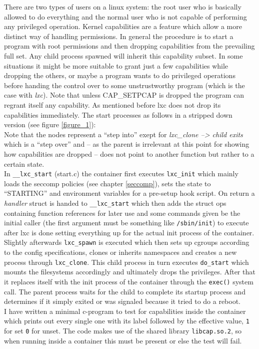 There are two types of users on a linux system: the root user who is basically allowed to do everything and the normal user 
who is not capable of performing any privileged operation. Kernel capabilities are a feature which allow a more distinct way of handling
permissions. In general the procedure is to start a program with root permissions and then dropping capabilities from the prevailing full set.
Any child process spawned will inherit this capability subset.
In some situations it might be more suitable to grant just a few capabilities while dropping the others, or maybe a program wants to do
privileged operations before handing the control over to some unstrustworthy program (which is the case with \textit{lxc}). Note
that unless CAP\_SETPCAP is dropped the program can regrant itself any capability\cite{kernelcaps}.
As mentioned before lxc does not drop its capabilities immediately. The start processes as follows in a stripped down version (see figure \ref{figure_1}):\\
Note that the nodes represent a ``step into'' exept for \textit{lxc\_clone --> child exits} which is a ``step over'' and -- as the parent is
irrelevant at this point for showing how capabilities are dropped -- does not point to another function but rather to a certain state.\\
In \texttt{\_\_lxc\_start} (start.c) the container first executes \texttt{lxc\_init} which mainly loads the seccomp policies (see chapter \ref{seccomp}),
sets the state to ``STARTING'' and environment variables for a pre-setup hook script. On return a \textit{handler} struct is handed to
\texttt{\_\_lxc\_start} which then adds the struct ops containing function references for later use and some commands given be the
initial caller (the first argument must be something like \texttt{/sbin/init}) to execute after lxc is done setting everything up for
the actual init process of the container.
Slightly afterwards \texttt{lxc\_spawn} is executed which then sets up cgroups according to the config specifications,
clones or inherits namespaces and creates a new process through \texttt{lxc\_clone}. This child process in turn executes \texttt{do\_start} which
mounts the filesystems accordingly and ultimately drops the privileges. After that it replaces itself with the init process of
the container through the \texttt{exec()} system call. The parent process waits for the child to complete its startup process and determines
if it simply exited or was signaled because it tried to do a reboot.\\
I have written a minimal c-program to test for capabilities inside the container which prints out every single one with
its label followed by the effective value, \texttt{1} for set \texttt{0} for unset. The code makes use of the shared library
\texttt{libcap.so.2}, so when running inside a container this must be present or else the test will fail.

